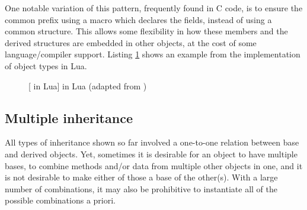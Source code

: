 
One notable variation of this pattern, frequently found in C code, is to ensure
the common prefix using a macro which declares the fields, instead of using a
common structure.  This allows some flexibility in how these members and the
derived structures are embedded in other objects, at the cost of some
language/compiler support.  Listing \ref{lst:c++:tvaluefields} shows an example
from the implementation of object types in Lua.

\begin{figure}[ht]
    \centering
    \begin{subfigure}[t]{0.5\textwidth}
        
    \end{subfigure}
    \begin{subfigure}[t]{0.45\textwidth}
        
    \end{subfigure}
        [ in Lua]
        { in Lua (adapted from )}
    \label{lst:c++:tvaluefields}
\end{figure}

\subsection{Multiple inheritance}

All types of inheritance shown so far involved a one-to-one relation between
base and derived objects.  Yet, sometimes it is desirable for an object to have
multiple bases, to combine methods and/or data from multiple other objects in
one, and it is not desirable to make either of those a base of the other(s).
With a large number of combinations, it may also be prohibitive to instantiate
all of the possible combinations a priori.

